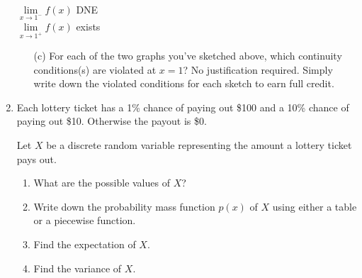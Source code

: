 \documentclass[11pt]{article}
\begin{document}
\begin{enumerate}
\begin{minipage}[t]{0.45\textwidth}
\begin{center}
        $\lim\limits_{x\to 1^-}f(x)$ DNE\\ $\lim\limits_{x\to 1^+}f(x)$ exists
        \end{center}
    \end{minipage}

    \begin{enumerate}
    
    \item[(c)] For each of the two graphs you've sketched above, which continuity conditions(s) are violated at $x=1$? No justification required. Simply write down the violated conditions for each sketch to earn full credit.
    
    \end{enumerate}


\newpage


\item Each lottery ticket has a 1\% chance of paying out \$100 and a 10\% chance of paying out \$10. Otherwise the payout is \$0.

Let $X$ be a discrete random variable representing the amount a lottery ticket pays out.

\begin{enumerate}
    \item What are the possible values of $X$?

    \vfill

    \item Write down the probability mass function $p(x)$ of $X$ using either a table or a piecewise function.

    \vfill
    \vfill

    \item Find the expectation of $X$.

    \vfill
    \vfill

    \item Find the variance of $X$.

    \vfill
    \vfill

\end{enumerate}



\end{enumerate}
\end{document}
